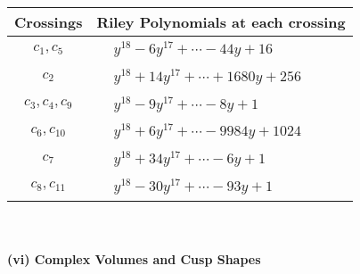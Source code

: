 \documentclass[1p]{elsarticle_modified}
\theoremstyle{definition}
\begin{document}
\begin{tabular}{m{50pt}|m{274pt}}
Crossings & \hspace{64pt}Riley Polynomials at each crossing \\
\hline $$\begin{aligned}c_{1},c_{5}\end{aligned}$$&$\begin{aligned}
&y^{18}-6 y^{17}+\cdots-44 y+16
\end{aligned}$\\
\hline $$\begin{aligned}c_{2}\end{aligned}$$&$\begin{aligned}
&y^{18}+14 y^{17}+\cdots+1680 y+256
\end{aligned}$\\
\hline $$\begin{aligned}c_{3},c_{4},c_{9}\end{aligned}$$&$\begin{aligned}
&y^{18}-9 y^{17}+\cdots-8 y+1
\end{aligned}$\\
\hline $$\begin{aligned}c_{6},c_{10}\end{aligned}$$&$\begin{aligned}
&y^{18}+6 y^{17}+\cdots-9984 y+1024
\end{aligned}$\\
\hline $$\begin{aligned}c_{7}\end{aligned}$$&$\begin{aligned}
&y^{18}+34 y^{17}+\cdots-6 y+1
\end{aligned}$\\
\hline $$\begin{aligned}c_{8},c_{11}\end{aligned}$$&$\begin{aligned}
&y^{18}-30 y^{17}+\cdots-93 y+1
\end{aligned}$\\
\hline
\end{tabular}\\~\\
\newpage\flushleft \textbf{(vi) Complex Volumes and Cusp Shapes}
\end{document}
